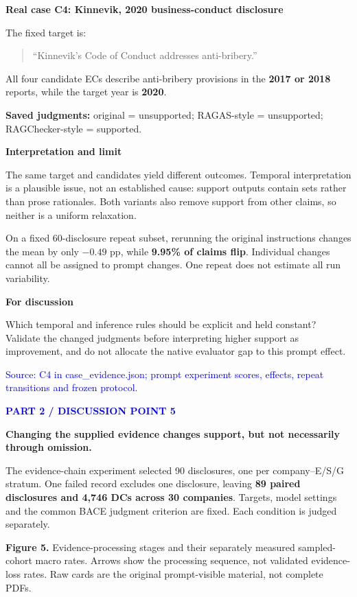 \documentclass[11pt,a4paper]{article}
\newcommand{\pagetitle}[2]{\textcolor{blue}{\small\bfseries #1}\par\vspace{2pt}{\LARGE\bfseries #2\par}\vspace{5pt}}
\newcommand{\lead}[1]{{\large\bfseries #1}\par}
\newcommand{\subhead}[1]{\vspace{5pt}\textbf{#1}\par}
\newcommand{\figcap}[2]{{\footnotesize\textbf{#1.} #2\par}}
\newcommand{\source}[1]{{\footnotesize\textcolor{blue}{Source: #1}\par}}
\newcommand{\question}[1]{\par\vspace{5pt}\noindent\colorbox{cream}{\parbox{\dimexpr\linewidth-2\fboxsep\relax}{\vspace{4pt}\textcolor{amber}{\textbf{For discussion}}\par #1\vspace{4pt}}}\par}
\newcommand{\quoted}[1]{\begin{quote}\small ``#1''\end{quote}}
\begin{document}
\subhead{Real case C4: Kinnevik, 2020 business-conduct disclosure}
The fixed target is:
\quoted{Kinnevik's Code of Conduct addresses anti-bribery.}
All four candidate ECs describe anti-bribery provisions in the \textbf{2017 or 2018} reports, while the target year is \textbf{2020}.

\textbf{Saved judgments:} original = unsupported; RAGAS-style = unsupported; RAGChecker-style = supported.

\subhead{Interpretation and limit}
The same target and candidates yield different outcomes. Temporal interpretation is a plausible issue, not an established cause: support outputs contain sets rather than prose rationales. Both variants also remove support from other claims, so neither is a uniform relaxation.

On a fixed 60-disclosure repeat subset, rerunning the original instructions changes the mean by only $-0.49$ pp, while \textbf{9.95\% of claims flip}. Individual changes cannot all be assigned to prompt changes. One repeat does not estimate all run variability.

\question{Which temporal and inference rules should be explicit and held constant? Validate the changed judgments before interpreting higher support as improvement, and do not allocate the native evaluator gap to this prompt effect.}
\source{C4 in case\_evidence.json; prompt experiment scores, effects, repeat transitions and frozen protocol.}

\newpage
\pagetitle{PART 2 / DISCUSSION POINT 5}{How much does evidence selection matter?}
\lead{Changing the supplied evidence changes support, but not necessarily through omission.}

The evidence-chain experiment selected 90 disclosures, one per company--E/S/G stratum. One failed record excludes one disclosure, leaving \textbf{89 paired disclosures and 4,746 DCs across 30 companies}. Targets, model settings and the common BACE judgment criterion are fixed. Each condition is judged separately.

\begin{center}
\end{center}
\figcap{Figure 5}{Evidence-processing stages and their separately measured sampled-cohort macro rates. Arrows show the processing sequence, not validated evidence-loss rates. Raw cards are the original prompt-visible material, not complete PDFs.}
\end{document}
